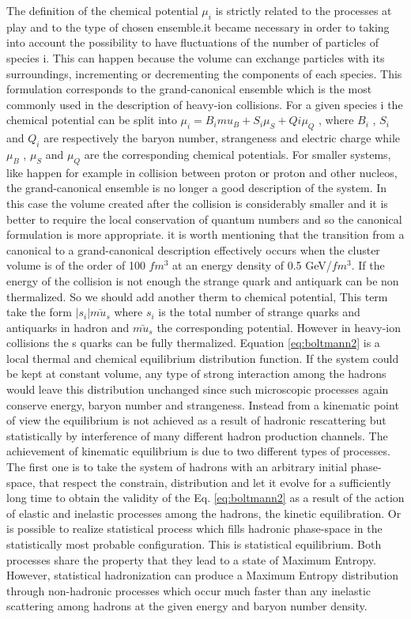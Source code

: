 \documentclass[12pt,a4paper]{book}
\begin{document}
	The definition of the chemical potential $\mu_i$ is strictly related to the processes at play and to the type of chosen ensemble.it became necessary in order to taking into account the possibility to have fluctuations of the number of particles of species i. This can happen because the volume can exchange particles with its surroundings, incrementing or decrementing the components of each species. This formulation corresponds to the grand-canonical ensemble which is the most commonly used in the description of heavy-ion collisions. For a given species i the chemical potential can be split into $\mu_i = B_i mu_B + S_i \mu_S + Qi \mu_Q$ , where $B_i$ , $S_i$ and $Q_i$ are respectively the baryon number, strangeness and electric charge while $\mu_B$ , $\mu_S$ and $\mu_Q$ are the corresponding chemical potentials. For smaller systems, like happen for example in collision between proton or proton and other nucleos, the grand-canonical ensemble is no longer a good description of the system. In this case the volume created after the collision is considerably smaller and it is better to require the local conservation of quantum numbers and so the canonical formulation is more appropriate. it is worth mentioning that the transition from a canonical to a grand-canonical description effectively occurs when the cluster volume is of the order of 100 $fm^3$ at an
	energy density of 0.5 GeV/$fm^3$. If the energy of the collision is not enough the strange quark and antiquark can be non thermalized. So we should add another therm to chemical potential, This term take the form $|s_i| \bar{mu_s}$ where $s_i$ is the total number of	strange quarks and antiquarks in hadron and $\bar{mu_s}$ the corresponding potential. However in heavy-ion collisions the s quarks can be fully thermalized. Equation \ref{eq:boltmann2} is a local thermal and chemical equilibrium distribution function. If the system could	be kept at constant volume, any type of strong interaction among the hadrons would leave this distribution unchanged since such microscopic processes again conserve energy, baryon number and strangeness. Instead from a kinematic point of view the equilibrium is not achieved as a result of hadronic rescattering but statistically by interference of many different hadron production channels. The achievement of kinematic equilibrium is due to two different types of processes. The first one is to take the system of hadrons with an arbitrary initial phase-space, that respect the constrain, distribution and let it evolve for a sufficiently long time to obtain the validity of the Eq. \ref{eq:boltmann2} as a result of the action of	elastic and inelastic processes among the hadrons, the kinetic equilibration. Or is possible to realize	statistical process which fills hadronic phase-space in the statistically most probable configuration. This	is statistical equilibrium. Both processes share the property that they lead to a state of Maximum Entropy.
	However, statistical hadronization can produce a Maximum Entropy distribution through non-hadronic processes which occur much faster than any inelastic scattering among hadrons at the given energy and	baryon number density. %
	
\end{document}

